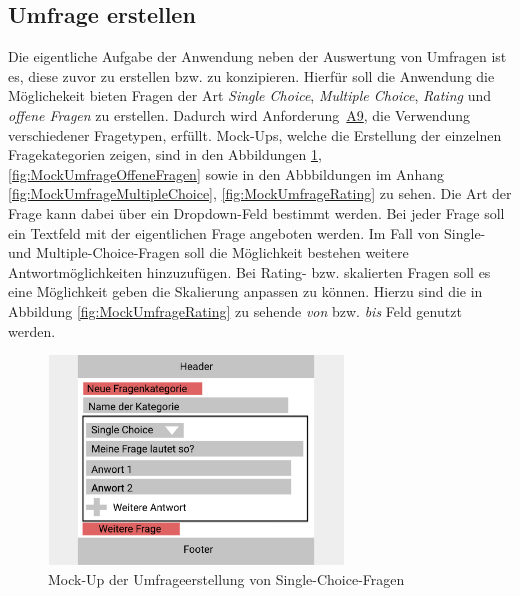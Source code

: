 \subsection{Umfrage erstellen}
\label{ssec:konzept:client:umfrage_erstellen}

Die eigentliche Aufgabe der Anwendung neben der Auswertung von Umfragen ist es, diese zuvor zu erstellen bzw. zu konzipieren.
Hierfür soll die Anwendung die Möglichekeit bieten Fragen der Art \emph{Single Choice}, \emph{Multiple Choice}, \emph{Rating} und \emph{offene Fragen} zu erstellen.
Dadurch wird Anforderung~\hyperref[Anf:A9]{A9}, die Verwendung verschiedener Fragetypen, erfüllt.
Mock-Ups, welche die Erstellung der einzelnen Fragekategorien zeigen, sind in den Abbildungen \ref{fig:MockUmfrageSingleChoice}, \ref{fig:MockUmfrageOffeneFragen} sowie in den Abbbildungen im Anhang \ref{fig:MockUmfrageMultipleChoice}, \ref{fig:MockUmfrageRating} zu sehen.
Die Art der Frage kann dabei über ein Dropdown-Feld bestimmt werden.
Bei jeder Frage soll ein Textfeld mit der eigentlichen Frage angeboten werden.
Im Fall von Single- und Multiple-Choice-Fragen soll die Möglichkeit bestehen weitere Antwortmöglichkeiten hinzuzufügen.
Bei Rating- bzw. skalierten Fragen soll es eine Möglichkeit geben die Skalierung anpassen zu können.
Hierzu sind die in Abbildung \ref{fig:MockUmfrageRating} zu sehende \emph{von} bzw. \emph{bis} Feld genutzt werden.

\begin{figure}[H]
	\centering
	\includegraphics[width=0.7\textwidth]{img/konzeption/client/umfrage_erstellen_single_choice}
	\captionsetup{justification=centering, format=plain}
	\caption[Mock-Up der Umfrageerstellung von Single-Choice-Fragen]{Mock-Up der Umfrageerstellung von Single-Choice-Fragen\\\figma}
	\label{fig:MockUmfrageSingleChoice}
\end{figure}

